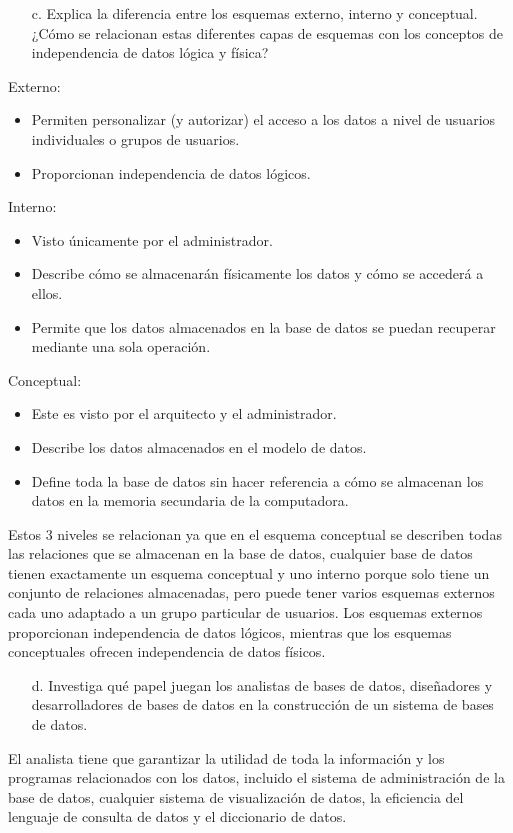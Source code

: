 \documentclass{article}
\begin{document}
\begin{enumerate}
    \begin{itemize}
    \item[c.]Explica la diferencia entre los esquemas externo, interno y conceptual. ¿Cómo se relacionan estas diferentes capas de esquemas con los conceptos de independencia de datos lógica y física?
    \end{itemize}
    Externo:
    \begin{itemize}
        \item Permiten personalizar (y autorizar) el acceso a los datos a nivel de usuarios individuales o grupos de usuarios.
        \item Proporcionan independencia de datos lógicos.
    \end{itemize}
    Interno: 
    \begin{itemize}
        \item Visto únicamente por el administrador.
        \item Describe cómo se almacenarán físicamente los datos y cómo se accederá a ellos.
        \item Permite que los datos almacenados en la base de datos se puedan recuperar mediante una sola operación.
    \end{itemize}
    Conceptual:
    \begin{itemize}
        \item Este es visto por el arquitecto y el administrador.
        \item Describe los datos almacenados en el modelo de datos.
        \item Define toda la base de datos sin hacer referencia a cómo se almacenan los datos en la memoria secundaria de la computadora.
    \end{itemize}
	Estos 3 niveles se relacionan ya que en el esquema conceptual se describen todas las relaciones que se almacenan en la base de datos, cualquier base de datos tienen exactamente un esquema conceptual y uno interno porque solo tiene un conjunto de relaciones almacenadas, pero puede tener varios esquemas externos cada uno adaptado a un grupo particular de usuarios.
Los esquemas externos proporcionan independencia de datos lógicos, mientras que los esquemas conceptuales ofrecen independencia de datos físicos.

\begin{itemize}
    \item[d.]Investiga qué papel juegan los analistas de bases de datos, diseñadores y desarrolladores de
    bases de datos en la construcción de un sistema de bases de datos.
    \end{itemize}
    El analista tiene que garantizar la utilidad de toda la información y los programas relacionados con los datos, incluido el sistema de administración de la base de datos, cualquier sistema de visualización de datos, la eficiencia del lenguaje de consulta de datos y el diccionario de datos. 


\end{enumerate}
\end{document}
